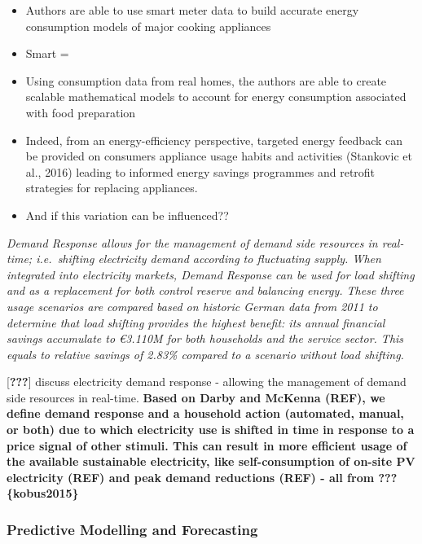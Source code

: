 \documentclass[11pt,]{article}
\providecommand{\tightlist}{%
  \setlength{\itemsep}{0pt}\setlength{\parskip}{0pt}}
\begin{document}
\begin{itemize}
\tightlist
\item
  Authors are able to use smart meter data to build accurate energy
  consumption models of major cooking appliances
\item
  Smart =
\item
  Using consumption data from real homes, the authors are able to create
  scalable mathematical models to account for energy consumption
  associated with food preparation
\item
  Indeed, from an energy-efficiency perspective, targeted energy
  feedback can be provided on consumers appliance usage habits and
  activities (Stankovic et al., 2016) leading to informed energy savings
  programmes and retrofit strategies for replacing appliances.
\item
  And if this variation can be influenced??
\end{itemize}

\emph{Demand Response allows for the management of demand side resources
in real-time; i.e.~shifting electricity demand according to fluctuating
supply. When integrated into electricity markets, Demand Response can be
used for load shifting and as a replacement for both control reserve and
balancing energy. These three usage scenarios are compared based on
historic German data from 2011 to determine that load shifting provides
the highest benefit: its annual financial savings accumulate to €3.110M
for both households and the service sector. This equals to relative
savings of 2.83\% compared to a scenario without load shifting.}

{[}{\textbf{???}}{]} discuss electricity demand response - allowing the
management of demand side resources in real-time. \textbf{Based on Darby
and McKenna (REF), we define demand response and a household action
(automated, manual, or both) due to which electricity use is shifted in
time in response to a price signal of other stimuli. This can result in
more efficient usage of the available sustainable electricity, like
self-consumption of on-site PV electricity (REF) and peak demand
reductions (REF) - all from \textbf{???}\{kobus2015\}}

\hypertarget{predictive-modelling-and-forecasting}{%
\subsubsection{Predictive Modelling and
Forecasting}\label{predictive-modelling-and-forecasting}}
\end{document}

